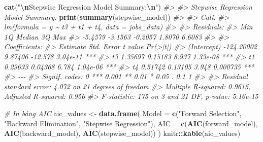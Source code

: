 \documentclass[
]{article}
\newenvironment{Shaded}{\begin{snugshade}}{\end{snugshade}}
\newcommand{\AttributeTok}[1]{\textcolor[rgb]{0.13,0.29,0.53}{#1}}
\newcommand{\CommentTok}[1]{\textcolor[rgb]{0.56,0.35,0.01}{\textit{#1}}}
\newcommand{\FunctionTok}[1]{\textcolor[rgb]{0.13,0.29,0.53}{\textbf{#1}}}
\newcommand{\NormalTok}[1]{#1}
\newcommand{\OtherTok}[1]{\textcolor[rgb]{0.56,0.35,0.01}{#1}}
\newcommand{\SpecialCharTok}[1]{\textcolor[rgb]{0.81,0.36,0.00}{\textbf{#1}}}
\newcommand{\StringTok}[1]{\textcolor[rgb]{0.31,0.60,0.02}{#1}}
\begin{document}
\begin{Shaded}
\begin{Highlighting}[]
\FunctionTok{cat}\NormalTok{(}\StringTok{"}\SpecialCharTok{\textbackslash{}n}\StringTok{Stepwise Regression Model Summary:}\SpecialCharTok{\textbackslash{}n}\StringTok{"}\NormalTok{)}
\CommentTok{\#\textgreater{} }
\CommentTok{\#\textgreater{} Stepwise Regression Model Summary:}
\FunctionTok{print}\NormalTok{(}\FunctionTok{summary}\NormalTok{(stepwise\_model))}
\CommentTok{\#\textgreater{} }
\CommentTok{\#\textgreater{} Call:}
\CommentTok{\#\textgreater{} lm(formula = y \textasciitilde{} t3 + t1 + t4, data = jobs\_data)}
\CommentTok{\#\textgreater{} }
\CommentTok{\#\textgreater{} Residuals:}
\CommentTok{\#\textgreater{}     Min      1Q  Median      3Q     Max }
\CommentTok{\#\textgreater{} {-}5.4579 {-}3.1563 {-}0.2057  1.8070  6.6083 }
\CommentTok{\#\textgreater{} }
\CommentTok{\#\textgreater{} Coefficients:}
\CommentTok{\#\textgreater{}               Estimate Std. Error t value Pr(\textgreater{}|t|)    }
\CommentTok{\#\textgreater{} (Intercept) {-}124.20002    9.87406 {-}12.578 3.04e{-}11 ***}
\CommentTok{\#\textgreater{} t3             1.35697    0.15183   8.937 1.33e{-}08 ***}
\CommentTok{\#\textgreater{} t1             0.29633    0.04368   6.784 1.04e{-}06 ***}
\CommentTok{\#\textgreater{} t4             0.51742    0.13105   3.948 0.000735 ***}
\CommentTok{\#\textgreater{} {-}{-}{-}}
\CommentTok{\#\textgreater{} Signif. codes:  0 \textquotesingle{}***\textquotesingle{} 0.001 \textquotesingle{}**\textquotesingle{} 0.01 \textquotesingle{}*\textquotesingle{} 0.05 \textquotesingle{}.\textquotesingle{} 0.1 \textquotesingle{} \textquotesingle{} 1}
\CommentTok{\#\textgreater{} }
\CommentTok{\#\textgreater{} Residual standard error: 4.072 on 21 degrees of freedom}
\CommentTok{\#\textgreater{} Multiple R{-}squared:  0.9615, Adjusted R{-}squared:  0.956 }
\CommentTok{\#\textgreater{} F{-}statistic:   175 on 3 and 21 DF,  p{-}value: 5.16e{-}15}

\CommentTok{\# In bảng AIC}
\NormalTok{aic\_values }\OtherTok{\textless{}{-}} \FunctionTok{data.frame}\NormalTok{(}
  \AttributeTok{Model =} \FunctionTok{c}\NormalTok{(}\StringTok{"Forward Selection"}\NormalTok{, }\StringTok{"Backward Elimination"}\NormalTok{, }\StringTok{"Stepwise Regression"}\NormalTok{),}
  \AttributeTok{AIC =} \FunctionTok{c}\NormalTok{(}\FunctionTok{AIC}\NormalTok{(forward\_model), }\FunctionTok{AIC}\NormalTok{(backward\_model), }\FunctionTok{AIC}\NormalTok{(stepwise\_model))}
\NormalTok{)}
\NormalTok{knitr}\SpecialCharTok{::}\FunctionTok{kable}\NormalTok{(aic\_values)}
\end{Highlighting}
\end{Shaded}
\end{document}
